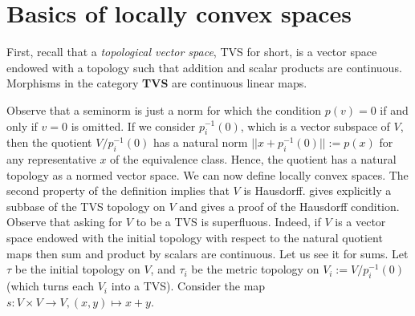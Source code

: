 \section{Basics of locally convex spaces} {\parskip=0pt
First, recall that a \textit{topological vector space}, TVS for short, is a vector space endowed with a topology such that addition and scalar products are continuous. Morphisms in the category \textbf{TVS} are continuous linear maps.

\Definition{\textbf{Seminorm}}{Let \(V\) be a TVS, a \textit{seminorm}\index{Seminorm} is a map \(p \colon V \to [0, \infty)\) satisfying
\begin{enumerate}
    \item \(p(\lambda v)=|\lambda| \cdot p(v)\) for every \(\lambda\in \R, v \in V\).
    \item \(p(v+w) \leq p(v)+p(w)\) for all \(v,w \in V\).
\end{enumerate}
}
Observe that a seminorm is just a norm for which the condition \(p(v)=0\) if and only if \(v=0\) is omitted. If we consider \(p_i^{-1}(0)\), which is a vector subspace of \(V\), then the quotient \(V/p_i^{-1}(0)\) has a natural norm \(||x+p_i^{-1}(0)||:=p(x)\) for any representative \(x\) of the equivalence class. Hence, the quotient has a natural topology as a normed vector space. We can now define locally convex spaces. 
The second property of the definition implies that \(V\) is Hausdorff. \parencite[Prop. A.10]{Schmeding_2022} gives explicitly a subbase of the TVS topology on \(V\) and gives a proof of the Hausdorff condition. Observe that asking for \(V\) to be a TVS is superfluous. Indeed, if \(V\) is a vector space endowed with the initial topology with respect to the natural quotient maps then sum and product by scalars are continuous. Let us see it for sums. Let \(\tau\) be the initial topology on \(V\), and \(\tau_i\) be the metric topology on \(V_i:=V/p_i^{-1}(0)\) (which turns each \(V_i\) into a TVS). Consider the map \(s\colon V \times V \to V, (x,y) \mapsto x+y\). }

